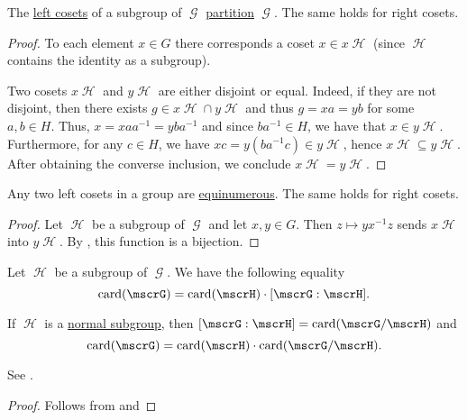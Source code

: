 \begin{lemma}\label{thm:group_coset_partition}
  The \hyperref[def:group_cosets]{left cosets} of a subgroup of \( \mscrG \) \hyperref[def:set_partition]{partition} \( \mscrG \). The same holds for right cosets.
\end{lemma}
\begin{proof}
  To each element \( x \in G \) there corresponds a coset \( x \in x\mscrH \) (since \( \mscrH \) contains the identity as a subgroup).

  Two cosets \( x\mscrH \) and \( y\mscrH \) are either disjoint or equal. Indeed, if they are not disjoint, then there exists \( g \in x\mscrH \cap y\mscrH \) and thus \( g = xa = yb \) for some \( a, b \in H \). Thus, \( x = x a a^{-1} = y b a^{-1} \) and since \( b a^{-1} \in H \), we have that \( x \in y\mscrH \). Furthermore, for any \( c \in H \), we have \( xc = y(b a^{-1} c) \in y\mscrH \), hence \( x\mscrH \subseteq y\mscrH \). After obtaining the converse inclusion, we conclude \( x\mscrH = y\mscrH \).
\end{proof}

\begin{lemma}\label{thm:group_coset_bijection}
  Any two left cosets in a group are \hyperref[def:equinumerosity]{equinumerous}. The same holds for right cosets.
\end{lemma}
\begin{proof}
  Let \( \mscrH \) be a subgroup of \( \mscrG \) and let \( x, y \in G \). Then \( z \mapsto y x^{-1} z \) sends \( x\mscrH \) into \( y\mscrH \). By , this function is a bijection.
\end{proof}

\begin{theorem}\label{thm:lagranges_theorem_for_groups}
  Let \( \mscrH \) be a subgroup of \( \mscrG \). We have the following equality
  \begin{equation}\label{eq:thm:lagranges_theorem_for_groups/index}
    \card(\mscrG) = \card(\mscrH) \cdot [\mscrG : \mscrH].
  \end{equation}

  If \( \mscrH \) is a \hyperref[def:normal_subgroup]{normal subgroup}, then \( [\mscrG : \mscrH] = \card(\mscrG / \mscrH) \) and
  \begin{equation}\label{eq:thm:lagranges_theorem_for_groups/card}
    \card(\mscrG) = \card(\mscrH) \cdot \card(\mscrG / \mscrH).
  \end{equation}

  See .
\end{theorem}
\begin{proof}
  Follows from  and 
\end{proof}

